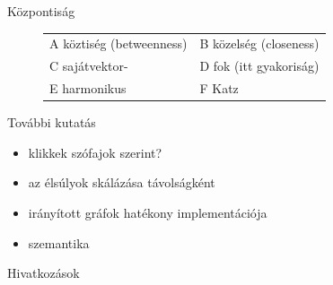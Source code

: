 \documentclass{beamer}
\newlength{\onecolwid}
\begin{document}
\begin{frame}[t]
\begin{columns}[t]
\begin{column}{\onecolwid}
\begin{block}{Központiság}
\begin{figure}
              \begin{tabular}{ll}
                \alert{A} köztiség (betweenness)	& \alert{B} közelség (closeness) \\
                \alert{C} sajátvektor-	& \alert{D} fok (itt gyakoriság)\\
                \alert{E} harmonikus	& \alert{F} Katz \\
              \end{tabular}
          \end{figure}
        \end{block}

        \bigskip

        \begin{block}{További kutatás}
          \begin{itemize}
            \item klikkek szófajok szerint?
            \item az élsúlyok skálázása távolságként
            \item irányított gráfok hatékony implementációja
            \item szemantika
          \end{itemize}
        \end{block}

        \bigskip

        \begin{block}{Hivatkozások}
          \small
            
            
        \end{block}

      \end{column} 
  \end{columns}
\end{frame}
\end{document}
